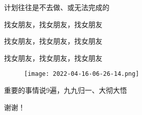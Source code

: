 \documentclass{ldr-simple-gray}
\begin{document}
\begin{frame}{计划往往是不去做、或无法完成的}

    找女朋友，找女朋友，找女朋友

    找女朋友，找女朋友，找女朋友

    找女朋友，找女朋友，找女朋友

    \begin{figure}[H]
        \centering
        \texttt{[image: 2022-04-16-06-26-14.png]}
    \end{figure}
    重要的事情说9遍，九九归一、大彻大悟

\end{frame}


\begin{frame}{\quad}
\begin{center}
        谢\quad 谢！
\end{center}

\end{frame}
\end{document}
